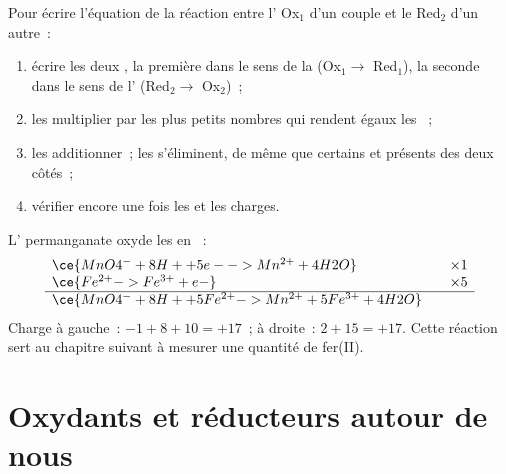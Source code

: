 \begin{method}\label{met:g11:redox:combine}
Pour écrire l'équation de la réaction entre l' Ox$_1$ d'un couple
et le  Red$_2$ d'un autre~:
\begin{enumerate}
  \item écrire les deux , la première dans le sens de la
         (Ox$_1 \to$ Red$_1$), la seconde dans le sens de
        l' (Red$_2 \to$ Ox$_2$)~;
  \item les multiplier par les plus petits nombres qui rendent égaux les
        ~;
  \item les additionner~; les  s'éliminent, de même que
        certains  et  présents des deux côtés~;
  \item vérifier encore une fois les  et les charges.
\end{enumerate}
\end{method}

\begin{example}\label{ex:g11:redox:mno4-fe}
L' permanganate oxyde les   en ~:
\[
\begin{array}{l@{\qquad}l}
  \ce{MnO4^- + 8H+ + 5e- -> Mn^{2+} + 4H2O} & \times 1\\
  \ce{Fe^{2+} -> Fe^{3+} + e-} & \times 5\\
  \hline
  \ce{MnO4^- + 8H+ + 5Fe^{2+} -> Mn^{2+} + 5Fe^{3+} + 4H2O} &
\end{array}
\]
Charge à gauche~: $-1 + 8 + 10 = +17$~; à droite~: $2 + 15 = +17$.
Cette réaction sert au chapitre suivant à mesurer une quantité de
fer(II).
\end{example}

\section{Oxydants et réducteurs autour de nous}

